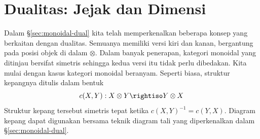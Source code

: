 
\section{Dualitas: Jejak dan Dimensi}\label{sec:symm-monoidal-dual}
\hypertarget{o014.aljabr2.chapter9.trace-and-dimension}{ }
Dalam \S\ref{sec:monoidal-dual} kita telah memperkenalkan beberapa konsep
yang berkaitan dengan dualitas. Semuanya memiliki versi kiri dan kanan,
bergantung pada posisi objek di dalam $\otimes$. Dalam banyak penerapan,
kategori monoidal yang ditinjau bersifat simetris sehingga kedua versi itu
tidak perlu dibedakan. Kita mulai dengan kasus kategori monoidal beranyam.
Seperti biasa, struktur kepangnya ditulis dalam bentuk
\[ c(X,Y): X \otimes Y \rightiso Y \otimes X \]
Struktur kepang tersebut simetris tepat ketika
$c(X,Y)^{-1}=c(Y,X)$. Diagram kepang dapat digunakan bersama teknik diagram
tali yang diperkenalkan dalam \S\ref{sec:monoidal-dual}.

